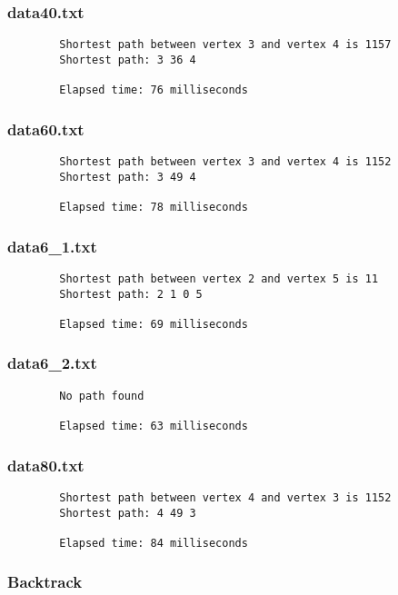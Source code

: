 \documentclass{article}
\begin{document}
    \subsubsection*{data40.txt}
    \begin{verbatim}
        Shortest path between vertex 3 and vertex 4 is 1157
        Shortest path: 3 36 4

        Elapsed time: 76 milliseconds
    \end{verbatim}

    \subsubsection*{data60.txt}
    \begin{verbatim}
        Shortest path between vertex 3 and vertex 4 is 1152
        Shortest path: 3 49 4

        Elapsed time: 78 milliseconds
    \end{verbatim}

    \subsubsection*{data6_1.txt}
    \begin{verbatim}
        Shortest path between vertex 2 and vertex 5 is 11
        Shortest path: 2 1 0 5

        Elapsed time: 69 milliseconds
    \end{verbatim}

    \subsubsection*{data6_2.txt}
    \begin{verbatim}
        No path found

        Elapsed time: 63 milliseconds
    \end{verbatim}

    \subsubsection*{data80.txt}
    \begin{verbatim}
        Shortest path between vertex 4 and vertex 3 is 1152
        Shortest path: 4 49 3

        Elapsed time: 84 milliseconds
    \end{verbatim}

    \subsubsection{Backtrack}
\end{document}

